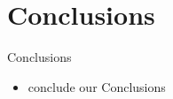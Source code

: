\section{Conclusions}

\begin{frame}{Conclusions}
    \begin{itemize}
        \item conclude our Conclusions
    \end{itemize}
\end{frame}

